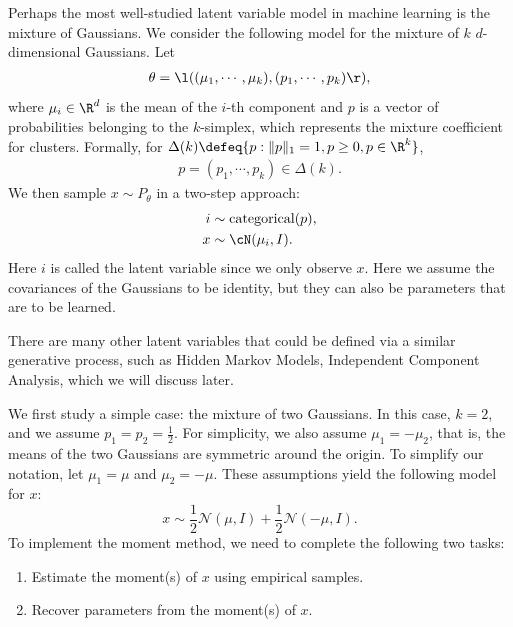 Perhaps the most well-studied latent variable model in machine learning is the mixture of Gaussians. We consider the following model for the mixture of $k$ $d$-dimensional Gaussians. Let 
\begin{align}
\theta = \l ( (\mu_1, \cdots, \mu_k), (p_1, \cdots, p_k)\r ),
\end{align}
where $\mu_i\in \R^d$ is the mean of the $i$-th component and $p$ is a vector of probabilities belonging to the $k$-simplex, which represents the mixture coefficient for clusters. Formally, for $\Delta(k) \defeq \{ p: \|p\|_1 = 1, p\geq 0, p\in\R^k\}$, 
\begin{align}
    p = (p_1, \cdots, p_k) \in \Delta(k).
\end{align}
We then sample $x \sim P_\theta$ in a two-step approach: 
\begin{align}
    i &\sim \text{categorical}(p), \notag\\
    x &\sim \cN(\mu_i, I).
\end{align}
Here $i$ is called the latent variable since we only observe $x$. Here we assume the covariances of the Gaussians to be identity, but they can also be parameters that are to be learned.

There are many other latent variables that could be defined via a similar generative process, such as Hidden Markov Models, Independent Component Analysis, which we will discuss later. %

We first study a simple case: the mixture of two Gaussians.
In this case, $k=2$, and we assume $p_1=p_2=\frac{1}{2}$. For simplicity, we also assume $\mu_1=-\mu_2$, that is, the means of the two Gaussians are symmetric around the origin. To simplify our notation, let $\mu_1=\mu$ and $\mu_2=-\mu$. These assumptions yield the following model for $x$:
\begin{equation}
    x \sim \frac{1}{2}\mathcal{N}(\mu,I) + \frac{1}{2}\mathcal{N}(-\mu,I).
\end{equation}
To implement the moment method, we need to complete the following two tasks:
\begin{enumerate}
    \item Estimate the moment(s) of $x$ using empirical samples.
    \item Recover parameters from the moment(s) of $x$.
\end{enumerate}

